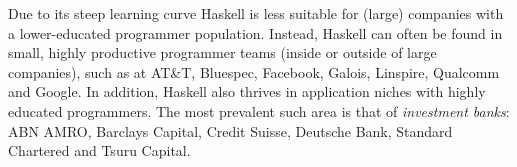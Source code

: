 Due to its steep learning curve Haskell is less suitable for (large) companies
with a lower-educated programmer population. Instead, Haskell can often be
found in small, highly productive programmer teams (inside or outside of large
companies), such as at AT\&T, Bluespec, Facebook, Galois, Linspire, Qualcomm
and Google. In addition, Haskell also thrives in application niches with
highly educated programmers.  The most prevalent such area is that of
\emph{investment banks}: ABN AMRO, Barclays Capital, Credit Suisse, Deutsche
Bank, Standard Chartered and Tsuru Capital.


% 
% 
%  
% 
